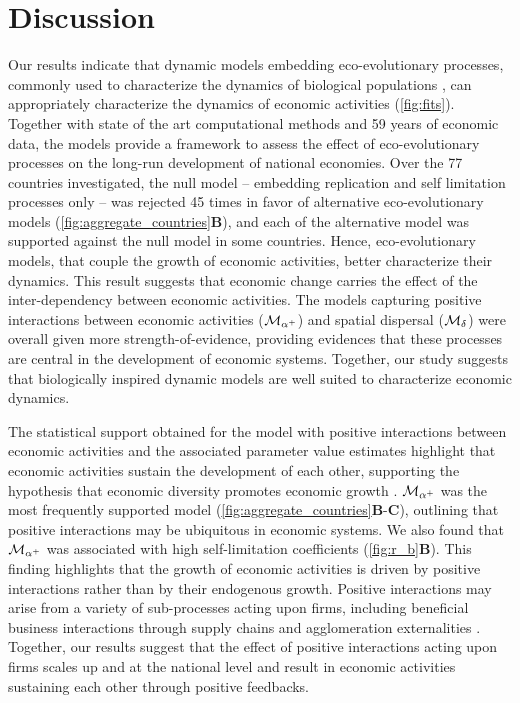 \section{Discussion}

Our results indicate that dynamic models embedding eco-evolutionary processes, commonly used to characterize the dynamics of biological populations \citep{Bunin2017,Scheffer2006a,Case1990,Tilman1994b,eigen1988molecular}, can appropriately characterize the dynamics of economic activities (\cref{fig:fits}). Together with state of the art computational methods and 59 years of economic data, the models provide a framework to assess the effect of eco-evolutionary processes on the long-run development of national economies.
% 
Over the 77 countries investigated, the null model -- embedding replication and self limitation processes only -- was rejected 45 times in favor of alternative eco-evolutionary models (\cref{fig:aggregate_countries}\textbf{B}), and each of the alternative model was supported against the null model in some countries. Hence, eco-evolutionary models, that couple the growth of economic activities, better characterize their dynamics. This result suggests that economic change carries the effect of the inter-dependency between economic activities. The models capturing positive interactions between economic activities ($\mathcal{M}_{\alpha^+}$) and spatial dispersal ($\mathcal{M}_\delta$) were overall given more strength-of-evidence, providing evidences that these processes are central in the development of economic systems.  Together, our study suggests that biologically inspired dynamic models are well suited to characterize economic dynamics. 

The statistical support obtained for the model with positive interactions between economic activities and the associated parameter value estimates highlight that economic activities sustain the development of each other, supporting the hypothesis that economic diversity promotes economic growth \citep{Saviotti2020}. $\mathcal{M}_{\alpha^+}$  was the most frequently supported model (\cref{fig:aggregate_countries}\textbf{B}-\textbf{C}), outlining that positive interactions may be ubiquitous in economic systems. We also found that $\mathcal{M}_{\alpha^+}$ was associated with high self-limitation coefficients (\cref{fig:r_b}\textbf{B}). This finding highlights that the growth of economic activities is driven by positive interactions rather than by their endogenous growth. 
% 
% 
Positive interactions may arise from a variety of sub-processes acting upon firms, including beneficial business interactions through supply chains \citep{Ozman2009,Saavedra2009a} and agglomeration externalities \citep{VanDerPanne2004}. Together, our results suggest that the effect of positive interactions acting upon firms scales up and at the national level and result in economic activities sustaining each other through positive feedbacks. 

